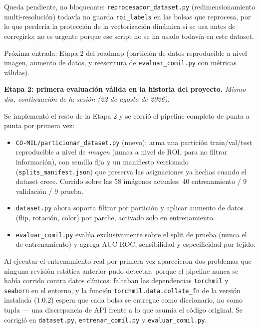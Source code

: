 \documentclass[12pt,letterpaper]{report}
\newcommand{\entrada}[2]{%
    \vspace{0.6em}
    \noindent\textbf{#1.} \textit{#2}
    \vspace{0.3em}
    \par
}
\begin{document}
Queda pendiente, no bloqueante: \texttt{reprocesador\_dataset.py} (redimensionamiento
multi-resolución) todavía no guarda \texttt{roi\_labels} en las bolsas que reprocesa, por lo que
perdería la protección de la vectorización dinámica si se usa antes de corregirlo; no es urgente
porque ese script no se ha usado todavía en este dataset.

Próxima entrada: Etapa 2 del roadmap (partición de datos reproducible a nivel imagen, aumento de
datos, y reescritura de \texttt{evaluar\_comil.py} con métricas válidas).

\entrada{Etapa 2: primera evaluación válida en la historia del proyecto}{Mismo día, continuación
de la sesión (22 de agosto de 2026).}

Se implementó el resto de la Etapa 2 y se corrió el pipeline completo de punta a punta por primera
vez:

\begin{itemize}[leftmargin=1.5em]
    \item \texttt{CO-MIL/particionar\_dataset.py} (nuevo): arma una partición train/val/test
        reproducible a nivel de \emph{imagen} (nunca a nivel de ROI, para no filtrar información),
        con semilla fija y un manifiesto versionado (\texttt{splits\_manifest.json}) que preserva
        las asignaciones ya hechas cuando el dataset crece. Corrido sobre las 58 imágenes actuales:
        40 entrenamiento / 9 validación / 9 prueba.
    \item \texttt{dataset.py} ahora soporta filtrar por partición y aplicar aumento de datos
        (flip, rotación, color) por parche, activado solo en entrenamiento.
    \item \texttt{evaluar\_comil.py} evalúa exclusivamente sobre el split de prueba (nunca el de
        entrenamiento) y agrega AUC-ROC, sensibilidad y especificidad por tejido.
\end{itemize}

Al ejecutar el entrenamiento real por primera vez aparecieron dos problemas que ninguna revisión
estática anterior pudo detectar, porque el pipeline nunca se había corrido contra datos clínicos:
faltaban las dependencias \texttt{torchmil} y \texttt{seaborn} en el entorno, y la función
\texttt{torchmil.data.collate\_fn} de la versión instalada (1.0.2) espera que cada bolsa se
entregue como diccionario, no como tupla --- una discrepancia de API frente a lo que asumía el
código original. Se corrigió en \texttt{dataset.py}, \texttt{entrenar\_comil.py} y
\texttt{evaluar\_comil.py}.
\end{document}
